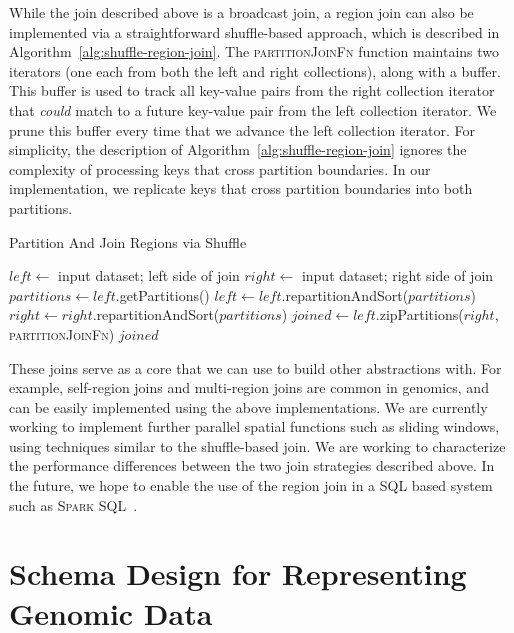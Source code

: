 \documentclass[phd]{ucbthesis}
\begin{document}
While the join described above is a broadcast join, a region join can also be implemented via a straightforward
shuffle-based approach, which is described in Algorithm~\ref{alg:shuffle-region-join}. The \textsc{partitionJoinFn}
function maintains two iterators (one each from both the left and right collections), along with a buffer. This buffer is
used to track all key-value pairs from the right collection iterator that \emph{could} match to a future key-value pair
from the left collection iterator. We prune this buffer every time that we advance the left collection iterator. For
simplicity, the description of Algorithm~\ref{alg:shuffle-region-join} ignores the complexity of processing keys that cross
partition boundaries. In our implementation, we replicate keys that cross partition boundaries into both partitions.

\begin{algorithm}
\caption{Partition And Join Regions via Shuffle}
\label{alg:shuffle-region-join}
\begin{algorithmic}
\STATE $left \leftarrow$ input dataset; left side of join
\STATE $right \leftarrow$ input dataset; right side of join
\STATE $partitions \leftarrow left$.getPartitions()
\STATE $left \leftarrow left$.repartitionAndSort($partitions$)
\STATE $right \leftarrow right$.repartitionAndSort($partitions$)
\STATE $joined \leftarrow left$.zipPartitions($right$, \textsc{partitionJoinFn})
\RETURN $joined$
\end{algorithmic}
\end{algorithm}

These joins serve as a core that we can use to build other abstractions with. For example, self-region joins and
multi-region joins are common in genomics, and can be easily implemented using the above implementations.
We are currently working to implement further parallel spatial functions such as sliding windows, using techniques
similar to the shuffle-based join. We are working to characterize the performance differences between the two
join strategies described above. In the future, we hope to enable the use of the region join in a SQL based system
such as \textsc{Spark SQL}~\cite{armbrust15}.

\section{Schema Design for Representing Genomic Data}
\label{sec:schema-design}
\end{document}
